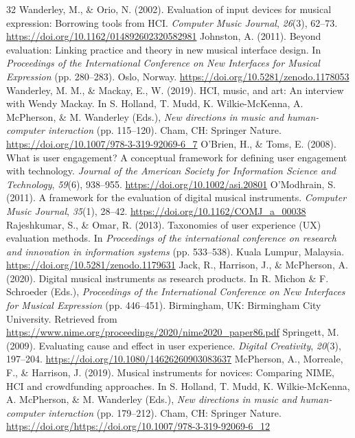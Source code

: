 \documentclass[sigconf]{nimeart}
\begin{document}
\begin{thebibliography}{32}
 {{ }}  Wanderley, M., \& Orio, N. (2002). Evaluation of input devices for musical expression: Borrowing tools from HCI. \emph{Computer Music Journal}, \emph{26}(3), 62--73. \url{https://doi.org/10.1162/014892602320582981}{}
 {{ }}  Johnston, A. (2011). Beyond evaluation: Linking practice and theory in new musical interface design. In \emph{Proceedings of the International Conference on New Interfaces for Musical Expression} (pp. 280--283). Oslo, Norway. \url{https://doi.org/10.5281/zenodo.1178053}{}
 {{ }}  Wanderley, M. M., \& Mackay, E., W. (2019). HCI, music, and art: An interview with Wendy Mackay. In S. Holland, T. Mudd, K. Wilkie-McKenna, A. McPherson, \& M. Wanderley (Eds.), \emph{New directions in music and human-computer interaction} (pp. 115--120). Cham, CH: Springer Nature. \url{https://doi.org/10.1007/978-3-319-92069-6_7}{}
 {{ }}  O'Brien, H., \& Toms, E. (2008). What is user engagement? A conceptual framework for defining user engagement with technology. \emph{Journal of the American Society for Information Science and Technology}, \emph{59}(6), 938--955. \url{https://doi.org/10.1002/asi.20801}{}
 {{ }}  O'Modhrain, S. (2011). A framework for the evaluation of digital musical instruments. \emph{Computer Music Journal}, \emph{35}(1), 28--42. \url{https://doi.org/10.1162/COMJ_a_00038}{}
 {{ }}  Rajeshkumar, S., \& Omar, R. (2013). Taxonomies of user experience (UX) evaluation methods. In \emph{Proceedings of the international conference on research and innovation in information systems} (pp. 533--538). Kuala Lumpur, Malaysia. \url{https://doi.org/10.5281/zenodo.1179631}{}
 {{ }}  Jack, R., Harrison, J., \& McPherson, A. (2020). Digital musical instruments as research products. In R. Michon \& F. Schroeder (Eds.), \emph{Proceedings of the International Conference on New Interfaces for Musical Expression} (pp. 446--451). Birmingham, UK: Birmingham City University. Retrieved from \url{https://www.nime.org/proceedings/2020/nime2020_paper86.pdf}{}
 {{ }}  Springett, M. (2009). Evaluating cause and effect in user experience. \emph{Digital Creativity}, \emph{20}(3), 197--204. \url{https://doi.org/10.1080/14626260903083637}{}
 {{ }}  McPherson, A., Morreale, F., \& Harrison, J. (2019). Musical instruments for novices: Comparing NIME, HCI and crowdfunding approaches. In S. Holland, T. Mudd, K. Wilkie-McKenna, A. McPherson, \& M. Wanderley (Eds.), \emph{New directions in music and human-computer interaction} (pp. 179--212). Cham, CH: Springer Nature. \url{https://doi.org/https://doi.org/10.1007/978-3-319-92069-6_12}{}

\end{thebibliography}
\end{document}
